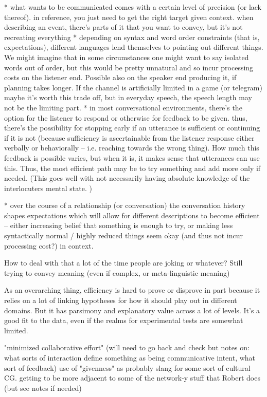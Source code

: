 \documentclass[]{article}
\begin{document}
* what wants to be communicated comes with a certain level of precision (or lack thereof). in reference, you just need to get the right target given context. when describing an event, there's parts of it that you want to convey, but it's not recreating everything
* depending on syntax and word order constraints (that is, expectations), different languages lend themselves to pointing out different things. We might imagine that in some circumstances one might want to say isolated words out of order, but this would be pretty unnatural and so incur processing costs on the listener end. Possible also on the speaker end producing it, if planning takes longer. If the channel is artificially limited in a game (or telegram) maybe it's worth this trade off, but in everyday speech, the speech length may not be the limiting part. 
* in most conversational environments, there's the option for the listener to respond or otherwise for feedback to be given. thus, there's the possibility for stopping early if an utterance is sufficient or continuing if it is not (because sufficiency is ascertainable from the listener response either verbally or behaviorally -- i.e. reaching towards the wrong thing). How much this feedback is possible varies, but when it is, it makes sense that utterances can use this. Thus, the most efficient path may be to try something and add more only if needed. (This goes well with not necessarily having absolute knowledge of the interlocuters mental state. )

* over the course of a relationship (or conversation) the conversation history shapes expectations which will allow for different descriptions to become efficient -- either increasing belief that something is enough to try, or making less syntactically normal / highly reduced things seem okay (and thus not incur processing cost?) in context. 

How to deal with that a lot of the time people are joking or whatever? Still trying to convey meaning (even if complex, or meta-linguistic meaning)

As an overarching thing, efficiency is hard to prove or disprove in part because it relies on a lot of linking hypotheses for how it should play out in different domains. But it has parsimony and explanatory value across a lot of levels. It's a good fit to the data, even if the realms for experimental tests are somewhat limited. 

\cite{fay2010} "minimized collaborative effort" (will need to go back and check but notes on: what sorts of interaction define something as being communicative intent, what sort of feedback) use of "givenness" as probably slang for some sort of cultural CG. getting to be more adjacent to some of the network-y stuff that Robert does (but see notes if needed) 
\end{document}
